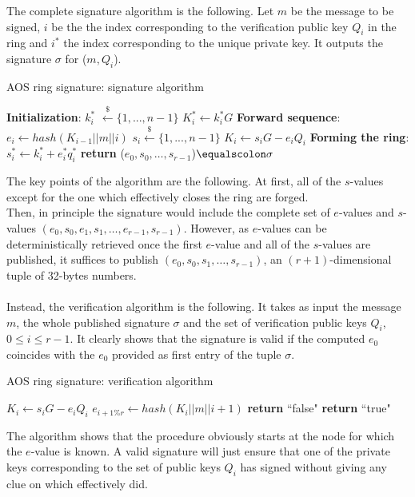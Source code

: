 The complete signature algorithm is the following. Let $m$ be the message to be signed, $i$ be the the index corresponding to the verification public key $Q_i$ in the ring and $i^{*}$ the index corresponding to the unique private key. It outputs the signature $\sigma$ for ($m, Q_i$).
\begin{algorithm}[H]
	\caption{AOS ring signature: signature algorithm}
	\label{alg:AOS_sign}
	\begin{algorithmic}[1]
		\State \textbf{Initialization}:
		\State $k_i^{*}$ $\xleftarrow{\text{\$}} \{1, ..., n - 1\}$
		\State $K_i^{*} \gets k_i^{*}G$
		\State \textbf{Forward sequence}:
		\State $e_i \gets hash(K_{i-1}||m||i)$
		\State $s_i\xleftarrow{\text{\$}} \{1, ..., n - 1\}$
		\State $K_i \gets s_iG - e_iQ_i$
		\EndFor
		\State \textbf{Forming the ring}:
		\State $s_i^{*} \gets k_i^{*} + e_i^{*}q_i^{*}$
		\State \textbf{return} ($e_0, s_0, \dots, s_{r-1}$)$\equalscolon \sigma$
		\EndProcedure
	\end{algorithmic}
\end{algorithm}
\noindent
The key points of the algorithm are the following. At first, all of the $s$-values except for the one which effectively closes the ring are forged.\\
Then, in principle the signature would include the complete set of $e$-values and $s$-values $(e_0, s_0, e_1, s_1, \dots, e_{r-1}, s_{r-1})$. However, as $e$-values can be deterministically retrieved once the first $e$-value and all of the $s$-values are published, it suffices to publish $(e_0, s_0, s_1, \dots, s_{r-1})$, an $(r+1)$-dimensional tuple of 32-bytes numbers. \\ \ \\
Instead, the verification algorithm is the following. It takes as input the message $m$, the whole published signature $\sigma$ and the set of verification public keys $Q_i$, $0 \leq i \leq r-1$. It clearly shows that the signature is valid if the computed $e_0$ coincides with the $e_0$ provided as first entry of the tuple $\sigma$.
\begin{algorithm}[H]
	\caption{AOS ring signature: verification algorithm}
	\label{alg:AOS_verify}
	\begin{algorithmic}[1]
		\State $K_i \gets s_iG - e_iQ_i$
		\State $e_{i+1\%r} \gets hash(K_i||m||i+1)$
		\EndFor
		\State \textbf{return} ``false"
		\EndIf
		\State \textbf{return} ``true"
		\EndIf 
		\EndProcedure
	\end{algorithmic}
\end{algorithm}
\noindent
The algorithm shows that the procedure obviously starts at the node for which the $e$-value is known. A valid signature will just ensure that one of the private keys corresponding to the set of public keys $Q_i$ has signed without giving any clue on which effectively did.

